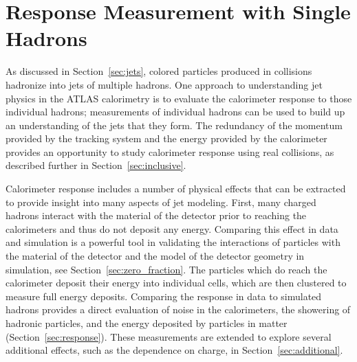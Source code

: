 \chapter{Response Measurement with Single Hadrons}

\newcommand*{\pL}{\ensuremath{\Lambda}\xspace}
\newcommand*{\pLB}{\ensuremath{\bar{\Lambda}}\xspace}
\newcommand*{\pKS}{\ensuremath{K_\text{S}^{0}}\xspace}
\newcommand*{\pKL}{\ensuremath{K_L}\xspace}
\newcommand*{\pP}{\ensuremath{p}\xspace}
\newcommand*{\pAP}{\ensuremath{\bar{p}}\xspace}
\newcommand*{\pip}{\ensuremath{\pi^+}\xspace}
\newcommand*{\pim}{\ensuremath{\pi^-}\xspace}
\newcommand*{\piz}{\ensuremath{\pi^0}\xspace}
\newcommand*{\ep}{\ensuremath{E/p}\xspace}
\newcommand*{\epav}{\ensuremath{\langle E/p \rangle}\xspace}
\newcommand*{\epcor}{\ensuremath{\langle E/p \rangle_{\mathrm{COR}}}\xspace}
\newcommand*{\epbg}{\ensuremath{\langle E/p \rangle_{\mathrm{BG}}}\xspace}
\newcommand*{\Ea}{\ensuremath{E_a}\xspace}
\newcommand*{\QGSP}{\texttt{QGSP\_BERT}\xspace}
\newcommand*{\FTFP}{\texttt{FTFP\_BERT}\xspace}


\label{ch:singlehadrons}

As discussed in Section~\ref{sec:jets}, colored particles produced in collisions hadronize into jets of multiple hadrons.
One approach to understanding jet physics in the ATLAS calorimetry is to evaluate the calorimeter response to those individual hadrons; measurements of individual hadrons can be used to build up an understanding of the jets that they form.
The redundancy of the momentum provided by the tracking system and the energy provided by the calorimeter provides an opportunity to study calorimeter response using real collisions, as described further in Section~\ref{sec:inclusive}.

Calorimeter response includes a number of physical effects that can be extracted to provide insight into many aspects of jet modeling.
First, many charged hadrons interact with the material of the detector prior to reaching the calorimeters and thus do not deposit any energy.
Comparing this effect in data and simulation is a powerful tool in validating the interactions of particles with the material of the detector and the model of the detector geometry in simulation, see Section~\ref{sec:zero_fraction}.
The particles which do reach the calorimeter deposit their energy into individual cells, which are then clustered to measure full energy deposits.
Comparing the response in data to simulated hadrons provides a direct evaluation of noise in the calorimeters, the showering of hadronic particles, and the energy deposited by particles in matter (Section~\ref{sec:response}). 
These measurements are extended to explore several additional effects, such as the dependence on charge, in Section~\ref{sec:additional}. 

